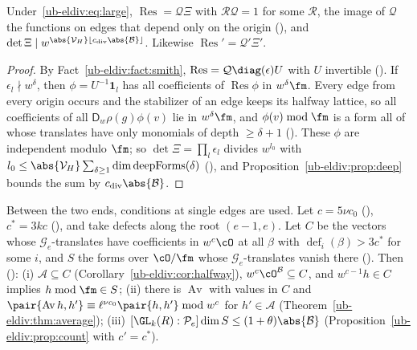 \begin{proposition}
\label{ub-eldiv:prop:ends}
Under~\eqref{ub-eldiv:eq:large}, $\operatorname{Res}=\mathcal Q\Xi$ with $\mathcal R\mathcal Q=1$ for some $\mathcal R$, the
image of $\mathcal Q$ the functions on edges that depend only on the origin
(), and $\det\Xi\mid w^{\abs{\mathcal V_H}\lfloor
c_{\mathrm{div}}\abs{\mathcal B}\rfloor}$. Likewise $\operatorname{Res}'=\mathcal Q'\Xi'$.
\end{proposition}

\begin{proof}
By Fact~\ref{ub-eldiv:fact:smith}, $\operatorname{Res}=\mathcal Q\diag(\epsilon)U$ with $U$ invertible
(). If $\epsilon_l\nmid w^\delta$, then
$\phi=U^{-1}\mathbf 1_l$ has all coefficients of $\operatorname{Res}\phi$ in $w^\delta\fm$. Every edge
from every origin occurs and the stabilizer of an edge keeps its halfway lattice, so all
coefficients of all $\mathsf D_w\rho(g)\phi(v)$ lie in $w^\delta\fm$, and $\phi(v)\bmod\fm$ is a form all of
whose translates have only monomials of depth $\ge\delta+1$ ().
These $\phi$ are independent modulo $\fm$; so $\det\Xi=\prod_l\epsilon_l$ divides $w^{l_0}$
with $l_0\le\abs{\mathcal V_H}\sum_{\delta\ge1}\dim\operatorname{deepForms}(\delta)$
(), and
Proposition~\ref{ub-eldiv:prop:deep} bounds the sum by $c_{\mathrm{div}}\abs{\mathcal B}$.
\end{proof}

Between the two ends, conditions at single edges are used. Let $c=5\nu c_0$
(), $c^*=3kc$ (), and take
defects along the root $(e-1,e)$. Let $C$ be the vectors whose $\mathcal G_e$-translates have
coefficients in $w^c\cO$ at all $\beta$ with $\operatorname{def}_i(\beta)>3c^*$ for some $i$, and $S$
the forms over $\cO/\fm$ whose $\mathcal G_e$-translates vanish there
(). Then ():
(i) $\mathcal A\subseteq C$ (Corollary~\ref{ub-eldiv:cor:halfway}), $w^c\cO^{\mathcal B}\subseteq C$,
and $w^{c-1}h\in C$ implies $h\bmod\fm\in S$; (ii) there is $\operatorname{Av}$ with values in $C$
and $\pair{\operatorname{Av}h,h'}\equiv \ell^{\nu c_0}\pair{h,h'}\bmod w^c$ for $h'\in\mathcal A$
(Theorem~\ref{ub-eldiv:thm:average}); (iii) $[\GL_k(R):\mathcal P_e]\dim S\le(1+\theta)\abs{\mathcal
B}$ (Proposition~\ref{ub-eldiv:prop:count} with $c'=c^*$).

